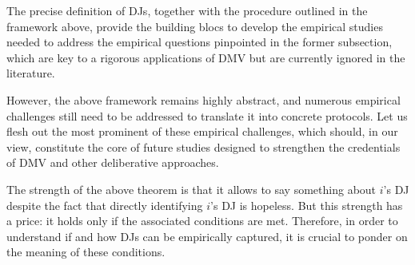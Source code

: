 \documentclass[version=3.21, pagesize, twoside=off, bibliography=totoc, DIV=calc, fontsize=12pt, a4paper, french, english]{scrartcl}
\begin{document}
{The precise definition of \acp{DJ}, together with the procedure outlined in the framework above, provide the building blocs to develop the empirical studies needed to address the empirical questions pinpointed in the former subsection, which are key to a rigorous applications of DMV but are currently ignored in the literature.


However, the above framework remains highly abstract, and numerous empirical challenges still need to be addressed to translate it into concrete protocols. Let us flesh out the most prominent of these empirical challenges, which should, in our view, constitute the core of future studies designed to strengthen the credentials of DMV and other deliberative approaches. 

The strength of the above theorem is that it allows to say something about $i$'s \ac{DJ} despite the fact that directly identifying $i$'s \ac{DJ} is hopeless. 
But this strength has a price: it holds only if the associated conditions are met. 
Therefore, in order to understand if and how \acp{DJ} can be empirically captured, it is crucial to ponder on the meaning of these conditions.

}
\end{document}

